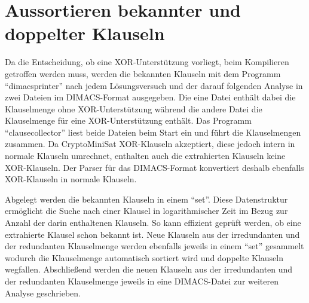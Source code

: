 \section{Aussortieren bekannter und doppelter Klauseln}
\label{sec:ana:rem_double}

Da die Entscheidung, ob eine XOR-Unterstützung vorliegt, beim Kompilieren getroffen werden muss, werden die bekannten Klauseln
mit dem Programm "`dimacsprinter"' nach jedem Lösungsversuch und der darauf folgenden Analyse in zwei Dateien im DIMACS-Format
ausgegeben. Die eine Datei enthält dabei die Klauselmenge ohne XOR-Unterstützung während die andere Datei die Klauselmenge für
eine XOR-Unterstützung enthält. Das Programm "`clausecollector"' liest beide Dateien beim Start ein und führt die Klauselmengen
zusammen. Da CryptoMiniSat XOR-Klauseln akzeptiert, diese jedoch intern in normale Klauseln umrechnet, enthalten auch die
extrahierten Klauseln keine XOR-Klauseln. Der Parser für das DIMACS-Format konvertiert deshalb ebenfalls XOR-Klauseln in normale
Klauseln.

Abgelegt werden die bekannten Klauseln in einem "`set"'. Diese Datenstruktur ermöglicht die Suche nach einer Klausel in logarithmischer
Zeit im Bezug zur Anzahl der darin enthaltenen Klauseln. So kann effizient geprüft werden, ob eine extrahierte Klausel schon bekannt ist.
Neue Klauseln aus der irredundanten und der redundanten Klauselmenge werden ebenfalls jeweils in einem "`set"' gesammelt wodurch die
Klauselmenge automatisch sortiert wird und doppelte Klauseln wegfallen. Abschließend werden die neuen Klauseln aus der irredundanten und
der redundanten Klauselmenge jeweils in eine DIMACS-Datei zur weiteren Analyse geschrieben.